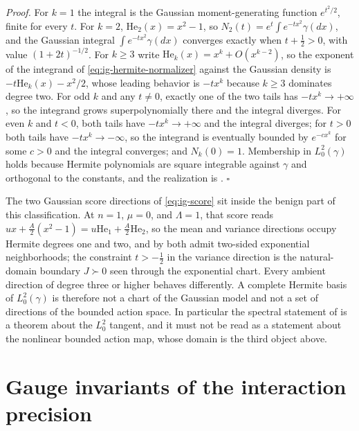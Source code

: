 \noindent\emph{Proof.} For $k=1$ the integral is the Gaussian
moment-generating function $e^{t^2/2}$, finite for every $t$. For $k=2$,
$\mathrm{He}_2(x)=x^2-1$, so
$N_2(t)=e^t\int e^{-tx^2}\gamma(dx)$, and the Gaussian integral
$\int e^{-tx^2}\gamma(dx)$ converges exactly when $t+\tfrac12>0$, with value
$(1+2t)^{-1/2}$. For $k\geq3$ write $\mathrm{He}_k(x)=x^k+O(x^{k-2})$, so the
exponent of the integrand of \eqref{eq:ig-hermite-normalizer} against the
Gaussian density is $-t\mathrm{He}_k(x)-x^2/2$, whose leading behavior is
$-tx^k$ because $k\geq3$ dominates degree two. For odd $k$ and any $t\neq0$,
exactly one of the two tails has $-tx^k\to+\infty$, so the integrand grows
superpolynomially there and the integral diverges. For even $k$ and $t<0$, both
tails have $-tx^k\to+\infty$ and the integral diverges; for $t>0$ both tails have
$-tx^k\to-\infty$, so the integrand is eventually bounded by $e^{-cx^k}$ for
some $c>0$ and the integral converges; and $N_k(0)=1$. Membership in
$L^2_0(\gamma)$ holds because Hermite polynomials are square integrable against
$\gamma$ and orthogonal to the constants, and the realization is
. \hfill$\square$

\medskip
The two Gaussian score directions of \eqref{eq:ig-score} sit inside the benign
part of this classification. At $n=1$, $\mu=0$, and $\Lambda=1$, that score reads
$u x+\tfrac A2(x^2-1)=u\mathrm{He}_1+\tfrac A2\mathrm{He}_2$, so the mean and
variance directions occupy Hermite degrees one and two, and by
 both admit two-sided exponential
neighborhoods; the constraint $t>-\tfrac12$ in the variance direction is the
natural-domain boundary $J\succ0$ seen through the exponential chart. Every
ambient direction of degree three or higher behaves differently. A complete
Hermite basis of $L^2_0(\gamma)$ is therefore not a chart of the Gaussian model
and not a set of directions of the bounded action space. In particular the
spectral statement of  is a theorem about
the $L^2_0$ tangent, and it must not be read as a statement about the nonlinear
bounded action map, whose domain is the third object above.

\section{Gauge invariants of the interaction precision}
\label{sec:ig-gauge}

